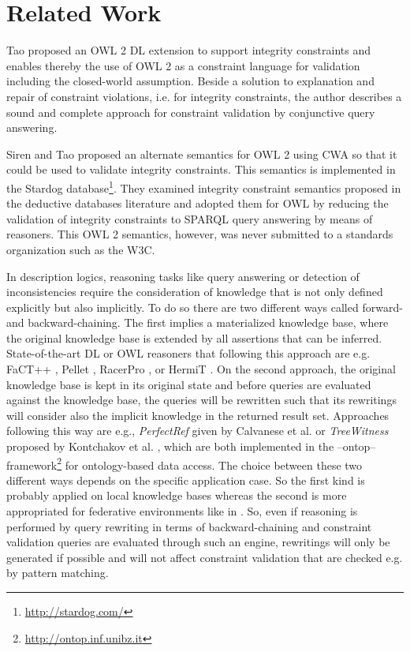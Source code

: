 \documentclass{llncs}
\begin{document}
\section{Related Work}
\label{sec:related-Work}

Tao \cite{tao2012integrity} proposed an OWL 2 DL extension to support integrity constraints and enables thereby the use of OWL 2 as a constraint language for validation including the closed-world assumption. Beside a solution to explanation and repair of constraint violations, i.e. for integrity constraints, the author describes a sound and complete approach for constraint validation by conjunctive query answering.

Siren and Tao proposed an alternate semantics for OWL 2 using CWA so that it could be used to validate integrity constraints.
This semantics is implemented in the Stardog database\footnote{\url{http://stardog.com/}}\cite{SirinTao2009}. 
They examined integrity constraint semantics proposed in the deductive databases literature and adopted them for OWL
by reducing the validation of integrity constraints to SPARQL query answering by means of reasoners.
This OWL 2 semantics, however, was never submitted to a standards organization such as the W3C.

In description logics, reasoning tasks like query answering or detection of inconsistencies require the consideration of knowledge that is not only defined explicitly but also implicitly. To do so there are two different ways called forward- and backward-chaining. The first implies a materialized knowledge base, where the original knowledge base is extended by all assertions that can be inferred. State-of-the-art DL or OWL reasoners that following this approach are e.g. FaCT++ \cite{tsarkov2006fact++}, Pellet \cite{sirin2007pellet},  RacerPro \cite{haarslev2001racer}, or HermiT \cite{horrocks2012hermit}. On the second approach, the original knowledge base is kept in its original state and before queries are evaluated against the knowledge base, the queries will be rewritten such that its rewritings will consider also the implicit knowledge in the returned result set. Approaches following this way are e.g., \emph{ PerfectRef} given by Calvanese et al. \cite{Calvanese2007} or \emph{TreeWitness} proposed by Kontchakov et al. \cite{kontchakov2011combined}, which are both implemented in the --ontop-- framework\footnote{\url{http://ontop.inf.unibz.it}} for ontology-based data access. The choice between these two different ways depends on the specific application case. So the first kind is probably applied on local knowledge bases whereas the second is more appropriated for federative environments like in \cite{nolle2014efficient,nolle2013elite}. 
So, even if reasoning is performed by query rewriting in terms of backward-chaining and constraint validation queries are evaluated through such an engine, rewritings will only be generated if possible and will not affect constraint validation that are checked e.g. by pattern matching.
\end{document}
